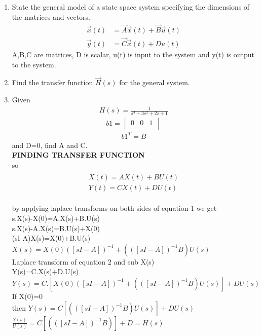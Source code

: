 \begin{enumerate}[label=\thesection.\arabic*.,ref=\thesection.\theenumi]
\item State the general model of a state space system specifying the dimensions of the matrices and vectors.
\\
\solution 
\begin{align}
\dot{\vec{x}(t)}&=\vec{A}\vec{x}(t)+\vec{B}\vec{u}(t) \\
 \vec{y}(t)&=\vec{C}\vec{x}(t)+D u(t)
\end{align}
A,B,C are matrices, D is scalar, u(t) is input to the system and y(t) is output to the system.
\item Find the transfer function $\vec{H}(s)$ for the general system.
\item Given 
\begin{align}
H(s)=\frac{1}{s^3+3s^2+2s+1}
\end{align}
\begin{equation}
 b1 =\begin{vmatrix}
  0&0&1\\
 \end{vmatrix}
\end{equation}
\begin{align}
b1^T=B
\end{align}
and D=0, find A and C.
\solution
\\ \textbf{FINDING TRANSFER FUNCTION}
\\so
\begin{align}
 \dot{X(t)}=AX(t)+BU(t) \\
 Y(t)=CX(t)+DU(t)
\end{align}    
\\by applying laplace transforms on both sides of equation 1
we get
\\s.X(s)-X(0)=A.X(s)+B.U(s)
\\s.X(s)-A.X(s)=B.U(s)+X(0)
\\(sI-A)X(s)=X(0)+B.U(s)
\\$X(s)=X(0)([sI-A])^{-1}+(([sI-A])^{-1}B)U(s)$
\\Laplace transform of equation 2 and sub X(s) 
\\Y(s)=C.X(s)+D.U(s)
\\$Y(s)=C.[X(0)([sI-A])^{-1 }+ (([sI-A])^{-1}B)U(s)]+DU(s)$
\\If X(0)=0
\\then $Y(s)=C[(([sI-A])^{-1}B)U(s)]+DU(s)$
\\$\frac{Y(s)}{U(s)}=C[(([sI-A])^{-1}B)]+D=H(s)$
\\

\end{enumerate}
